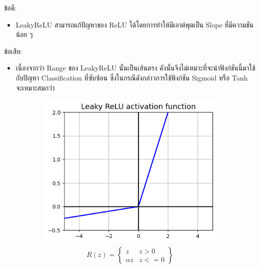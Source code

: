 \noindent ข้อดี:
\begin{itemize}[topsep=0pt,noitemsep]\setlength\itemsep{0.5em}
  \item LeakyReLU สามารถแก้ปัญหาของ ReLU ได้โดยการทำให้มีเอาต์พุตเป็น Slope ที่มีความชันน้อย ๆ
\end{itemize}
%
ข้อเสีย:
\begin{itemize}[topsep=0pt,noitemsep]\setlength\itemsep{0.5em}
  \item เนื่องจากว่า Range ของ LeakyReLU นั้นเป็นเส้นตรง ดังนั้นจึงไม่เหมาะที่จะนำฟังก์ชันนี้มาใช้กับปัญหา Classification ที่ซับซ้อน ซึ่งในกรณีดังกล่าวการใช้ฟังก์ชัน Sigmoid หรือ Tanh จะเหมาะสมกว่า
\end{itemize}
%
\begin{figure}[H]
  \centering
  \begin{subfigure}{0.5\textwidth}
      \centering
      \includegraphics[width=0.9\linewidth]{fig/actfunc_leakyrelu.png}
      \caption{%
          \begin{equation}
              \begin{split}R(z) =
                  \begin{Bmatrix}
                      z        & z > 0  \\
                      \alpha z & z <= 0
                  \end{Bmatrix}
              \end{split}
          \end{equation}
      }
      \label{fig:actfunc_leakyrelu}
  \end{subfigure}%
  \begin{subfigure}{0.5\textwidth}

\end{subfigure}
\end{figure}
